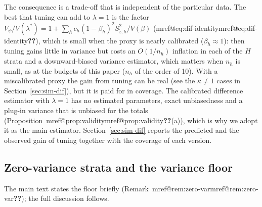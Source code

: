 \documentclass[pdflatex,sn-mathphys-num,iicol]{sn-jnl}
\makeatletter
\theoremstyle{thmstyleone}
\theoremstyle{thmstyletwo}
\theoremstyle{thmstylethree}
\newcommand{\Mref}[1]{\ifcsname mref@#1\endcsname\csname mref@#1\endcsname\else\textbf{??}\fi}
\makeatother
\begin{document}
The consequence is a trade-off that is independent of the particular data. The best that tuning can add to $\lambda=1$ is the factor
$V_\psi/V(\lambda^\ast)=1+\sum_hc_h(1-\beta_h)^2S^2_{\tilde z,h}/V(\beta)$ (\Mref{eq:dif-identity}), which is small when the proxy is nearly calibrated ($\beta_h\approx1$): then
tuning gains little in variance but costs an $O(1/n_h)$ inflation in each of the $H$ strata and a downward-biased variance estimator, which matters when $n_h$ is small, as
at the budgets of this paper ($n_h$ of the order of 10). With a miscalibrated proxy the gain from tuning can be real (see the $\kappa\ne1$ cases in
Section~\ref{sec:sim-dif}), but it is paid for in coverage. The calibrated difference estimator with $\lambda=1$ has no estimated
parameters, exact unbiasedness and a plug-in variance that is unbiased for the totals (Proposition~\Mref{prop:validity}(a)), which is why we adopt it as the main
estimator. Section~\ref{sec:sim-dif} reports the predicted and the observed gain of tuning together with the coverage of each version.

\subsection{Zero-variance strata and the variance floor}\label{si:theory-floor}

The main text states the floor briefly (Remark~\Mref{rem:zero-var}); the full discussion follows.
\end{document}
